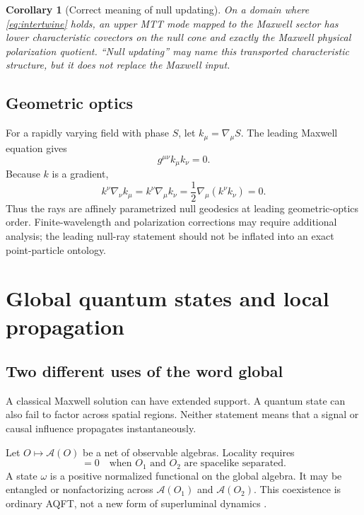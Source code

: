 \documentclass[11pt,a4paper]{article}
\numberwithin{equation}{section}
\newtheorem{corollary}[theorem]{Corollary}
\theoremstyle{definition}
\theoremstyle{remark}
\newcommand{\cA}{\mathcal A}
\begin{document}
\begin{corollary}[Correct meaning of null updating]
On a domain where \eqref{eq:intertwine} holds, an upper MTT mode mapped to
the Maxwell sector has lower characteristic covectors on the null cone
and exactly the Maxwell physical polarization quotient.  ``Null
updating'' may name this transported characteristic structure, but it
does not replace the Maxwell input.
\end{corollary}

\subsection{Geometric optics}

For a rapidly varying field with phase \(S\), let
\(k_\mu=\nabla_\mu S\).  The leading Maxwell equation gives
\[
g^{\mu\nu}k_\mu k_\nu=0.
\]
Because \(k\) is a gradient,
\[
k^\nu\nabla_\nu k_\mu
=k^\nu\nabla_\mu k_\nu
=\frac12\nabla_\mu(k^\nu k_\nu)=0.
\]
Thus the rays are affinely parametrized null geodesics at leading
geometric-optics order.  Finite-wavelength and polarization corrections
may require additional analysis; the leading null-ray statement should
not be inflated into an exact point-particle ontology.

\section{Global quantum states and local propagation}

\subsection{Two different uses of the word global}

A classical Maxwell solution can have extended support.  A quantum state
can also fail to factor across spatial regions.  Neither statement means
that a signal or causal influence propagates instantaneously.

Let \(O\mapsto\cA(O)\) be a net of observable algebras.  Locality requires
\begin{equation}
[\cA(O_1),\cA(O_2)]=0
\quad\text{when }O_1\text{ and }O_2\text{ are spacelike separated}.
\label{eq:locality}
\end{equation}
A state \(\omega\) is a positive normalized functional on the global
algebra.  It may be entangled or nonfactorizing across
\(\cA(O_1)\) and \(\cA(O_2)\).  This coexistence is ordinary AQFT, not a
new form of superluminal dynamics \cite{HaagKastler1964,BFV2003,HollandsSanders2018}.
\end{document}
